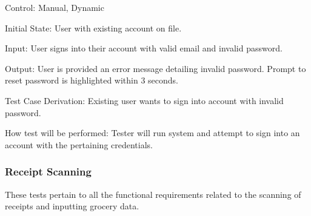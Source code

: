 \documentclass[12pt, titlepage]{article}
\begin{document}
\begin{enumerate}
Control: Manual, Dynamic
          
Initial State: User with existing account on file.
          
Input: User signs into their account with valid email and invalid password.
          
Output: User is provided an error message detailing invalid password. Prompt to reset password is highlighted within 3 seconds.

Test Case Derivation: Existing user wants to sign into account with invalid password.
          
How test will be performed: Tester will run system and attempt to sign into an account with the pertaining credentials.

\end{enumerate}

\subsubsection{Receipt Scanning}

These tests pertain to all the functional requirements related to the scanning of receipts and inputting grocery data.
\end{document}
